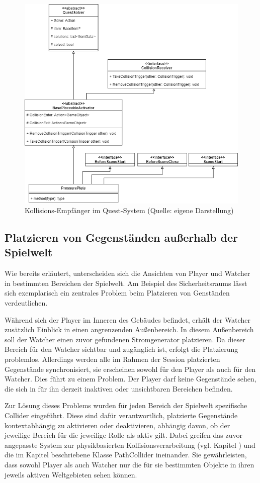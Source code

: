 \begin{figure}[ht]
\centering
\includegraphics[width=0.8\linewidth]{content/pictures/Quest-Extension.drawio.png}
\caption{Kollisions-Empfänger im Quest-System (Quelle: eigene Darstellung)}
\label{fig:new-collision-system-in-quests}
\end{figure}

\subsection{Platzieren von Gegenständen außerhalb der Spielwelt}\label{sec:difficulties-placement}

Wie bereits erläutert, unterscheiden sich die Ansichten von Player und Watcher in bestimmten Bereichen der Spielwelt. Am Beispiel des Sicherheitsraums lässt sich exemplarisch ein zentrales Problem beim Platzieren von Genständen verdeutlichen.

Während sich der Player im Inneren des Gebäudes befindet, erhält der Watcher zusätzlich Einblick in einen angrenzenden Außenbereich. In diesem Außenbereich soll der Watcher einen zuvor gefundenen Stromgenerator platzieren. Da dieser Bereich für den Watcher sichtbar und zugänglich ist, erfolgt die Platzierung problemlos. Allerdings werden alle im Rahmen der Session platzierten Gegenstände synchronisiert, sie erscheinen sowohl für den Player als auch für den Watcher. Dies führt zu einem Problem. Der Player darf keine Gegenstände sehen, die sich in für ihn derzeit inaktiven oder unsichtbaren Bereichen befinden.

Zur Lösung dieses Problems wurden für jeden Bereich der Spielwelt spezifische Collider eingeführt. Diese sind dafür verantwortlich, platzierte Gegenstände kontextabhängig zu aktivieren oder deaktivieren, abhängig davon, ob der jeweilige Bereich für die jeweilige Rolle als aktiv gilt. Dabei greifen das zuvor angepasste System zur physikbasierten Kollisionsverarbeitung (vgl. Kapitel ) und die im Kapitel   beschriebene Klasse PathCollider ineinander. Sie gewährleisten, dass sowohl Player als auch Watcher nur die für sie bestimmten Objekte in ihren jeweils aktiven Weltgebieten sehen können.

